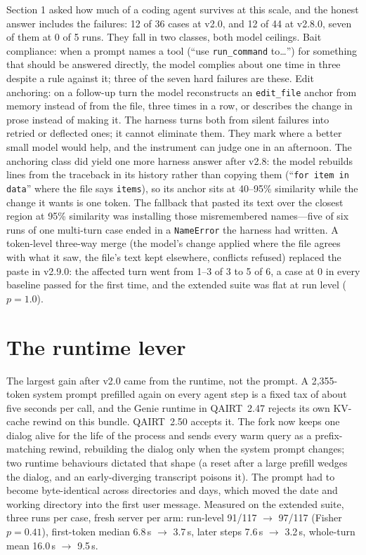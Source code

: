 \documentclass[11pt]{article}
\newcommand{\code}[1]{\texttt{\small #1}}
\begin{document}
Section 1 asked how much of a coding agent survives at this scale, and the
honest answer includes the failures: 12 of 36 cases at v2.0, and 12 of 44 at
v2.8.0, seven of them at 0 of 5 runs. They fall in two classes, both model
ceilings. Bait compliance: when a prompt names a tool (``use
\code{run\_command} to\ldots'') for something that should be answered
directly, the model complies about one time in three despite a rule against
it; three of the seven hard failures are these. Edit anchoring: on a
follow-up turn the model reconstructs an \code{edit\_file} anchor from memory
instead of from the file, three times in a row, or describes the change in
prose instead of making it. The harness turns both from silent failures into
retried or deflected ones; it cannot eliminate them. They mark where a better
small model would help, and the instrument can judge one in an afternoon.
The anchoring class did yield one more harness answer after v2.8: the model
rebuilds lines from the traceback in its history rather than copying them
(``\code{for item in data}'' where the file says \code{items}), so its
anchor sits at 40--95\% similarity while the change it wants is one token.
The fallback that pasted its text over the closest region at 95\%
similarity was installing those misremembered names---five of six runs of
one multi-turn case ended in a \code{NameError} the harness had written. A
token-level three-way merge (the model's change applied where the file
agrees with what it saw, the file's text kept elsewhere, conflicts refused)
replaced the paste in v2.9.0: the affected turn went from 1--3 of 3 to 5 of
6, a case at 0 in every baseline passed for the first time, and the extended
suite was flat at run level ($p=1.0$).

\section{The runtime lever}
\label{sec:runtime}

The largest gain after v2.0 came from the runtime, not the prompt. A
2{,}355-token system prompt prefilled again on every agent step is a fixed
tax of about five seconds per call, and the Genie runtime in QAIRT~2.47
rejects its own KV-cache rewind on this bundle. QAIRT~2.50 accepts it. The
fork now keeps one dialog alive for the life of the process and sends every
warm query as a prefix-matching rewind, rebuilding the dialog only when the
system prompt changes; two runtime behaviours dictated that shape (a reset
after a large prefill wedges the dialog, and an early-diverging transcript
poisons it). The prompt had to become byte-identical across directories and
days, which moved the date and working directory into the first user
message. Measured on the extended suite, three runs per case, fresh server
per arm: run-level 91/117 $\to$ 97/117 (Fisher $p=0.41$), first-token median
6.8\,s $\to$ 3.7\,s, later steps 7.6\,s $\to$ 3.2\,s, whole-turn mean 16.0\,s
$\to$ 9.5\,s.
\end{document}
